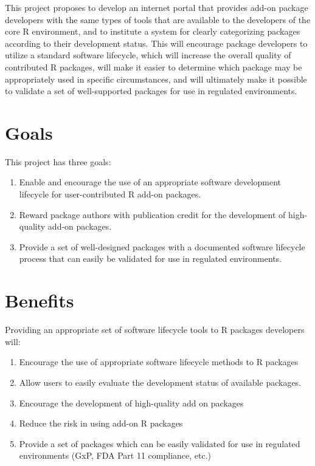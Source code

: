 \documentclass[12pt]{article}
\begin{document}
This project proposes to develop an internet portal that provides
add-on package developers with the same types of tools that are
available to the developers of the core R environment, and to
institute a system for clearly categorizing packages according to
their development status.	 This will encourage package developers to
utilize a standard software lifecycle, which will increase the
overall quality of contributed R packages, will make it easier to
determine which package may be appropriately used in specific
circumstances, and will ultimately make it possible to validate a
set of well-supported packages for use in regulated environments.


\section{Goals}

This project has three goals:

\begin{enumerate}
\item Enable and encourage the use of an appropriate software
	development lifecycle for user-contributed R add-on packages.

\item Reward package authors with publication credit for the
	development of high-quality add-on packages.

\item Provide a set of well-designed packages with a documented
	software lifecycle process that can easily be validated for use in
	regulated environments.

\end{enumerate}

\section{Benefits}

Providing an appropriate set of software lifecycle tools to R packages
developers will:
\begin{enumerate}
\item Encourage the use of appropriate software lifecycle methods to R
	packages
\item Allow users to easily evaluate the development status of
	available packages.
\item Encourage the development of high-quality add on packages
\item Reduce the risk in using add-on R packages
\item Provide a set of packages which can be easily validated for use
	in regulated environments (GxP, FDA Part 11 compliance, etc.)
\end{enumerate}
\end{document}
